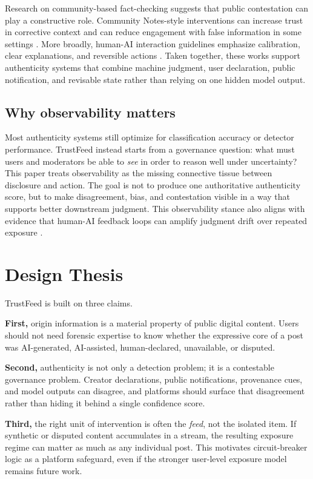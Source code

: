\documentclass[acmlarge,screen,nonacm]{acmart}
\begin{document}
Research on community-based fact-checking suggests that public contestation can play a constructive role. Community Notes-style interventions can increase trust in corrective context and can reduce engagement with false information in some settings \cite{drolsbach2024community, slaughter2025community}. More broadly, human-AI interaction guidelines emphasize calibration, clear explanations, and reversible actions \cite{amershi2019guidelines}. Taken together, these works support authenticity systems that combine machine judgment, user declaration, public notification, and revisable state rather than relying on one hidden model output.

\subsection{Why observability matters}

Most authenticity systems still optimize for classification accuracy or detector performance. TrustFeed instead starts from a governance question: what must users and moderators be able to \emph{see} in order to reason well under uncertainty? This paper treats observability as the missing connective tissue between disclosure and action. The goal is not to produce one authoritative authenticity score, but to make disagreement, bias, and contestation visible in a way that supports better downstream judgment. This observability stance also aligns with evidence that human-AI feedback loops can amplify judgment drift over repeated exposure \cite{glickman2025feedback, spearing2025countering}.

\section{Design Thesis}

TrustFeed is built on three claims.

\textbf{First,} origin information is a material property of public digital content. Users should not need forensic expertise to know whether the expressive core of a post was AI-generated, AI-assisted, human-declared, unavailable, or disputed.

\textbf{Second,} authenticity is not only a detection problem; it is a contestable governance problem. Creator declarations, public notifications, provenance cues, and model outputs can disagree, and platforms should surface that disagreement rather than hiding it behind a single confidence score.

\textbf{Third,} the right unit of intervention is often the \emph{feed}, not the isolated item. If synthetic or disputed content accumulates in a stream, the resulting exposure regime can matter as much as any individual post. This motivates circuit-breaker logic as a platform safeguard, even if the stronger user-level exposure model remains future work.
\end{document}
